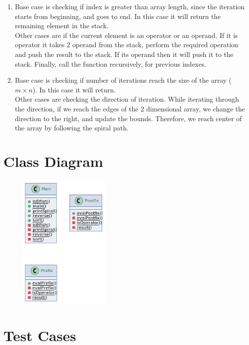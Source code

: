 \documentclass[a4paper]{article}
\begin{document}
\begin{large}
\begin{enumerate}
    \item Base case is checking if index is greater than array length, since the iteration starts from beginning, and goes to end. In this case it will return the remaining element in the stack.\\
    Other cases are if the current element is an operator or an operand. If it is operator it takes 2 operand from the stack, perform the required operation and push the result to the stack. If its operand then it will push it to the stack. Finally, call the function recursively, for previous indexes.

    \item Base case is checking if number of iterations reach the size of the array ($m \times n$). In this case it will return.\\
    Other cases are checking the direction of iteration. While iterating through the direction, if we reach the edges of the 2 dimensional array, we change the direction to the right, and update the bounds. Therefore, we reach center of the array by following the spiral path.

  \end{enumerate}

  \newpage

  \section{Class Diagram}

  \begin{figure}[htp]
    \centering
    \includegraphics[width=0.4\textwidth]{class-diagram-2}
  \end{figure}

  
  \newpage

  \section{Test Cases}


\end{large}
\end{document}
